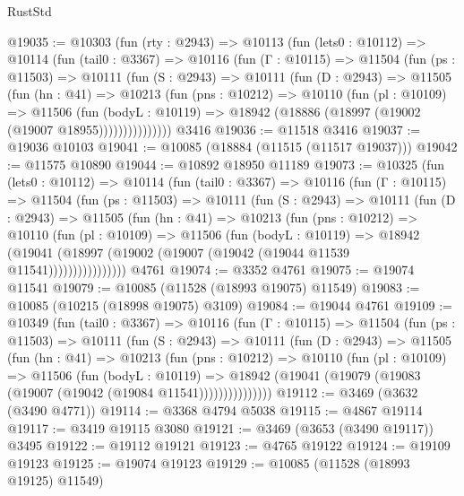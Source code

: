 \begin{lexlean}{RustStd}
\begin{coremodule}
@19035 := @10303
    (fun (rty : @2943) =>
    @10113
      (fun (lets0 : @10112) =>
      @10114
        (fun (tail0 : @3367) =>
        @10116
          (fun (Γ : @10115) =>
          @11504
            (fun (ps : @11503) =>
            @10111
              (fun (S : @2943) =>
              @10111
                (fun (D : @2943) =>
                @11505
                  (fun (hn : @41) =>
                  @10213
                    (fun (pns : @10212) =>
                    @10110
                      (fun (pl : @10109) =>
                      @11506
                        (fun (bodyL : @10119) =>
                        @18942 (@18886 (@18997 (@19002 (@19007 @18955)))))))))))))))
    @3416
@19036 := @11518 @3416
@19037 := @19036 @10103
@19041 := @10085 (@18884 (@11515 (@11517 @19037)))
@19042 := @11575 @10890
@19044 := @10892 @18950 @11189
@19073 := @10325
    (fun (lets0 : @10112) =>
    @10114
      (fun (tail0 : @3367) =>
      @10116
        (fun (Γ : @10115) =>
        @11504
          (fun (ps : @11503) =>
          @10111
            (fun (S : @2943) =>
            @10111
              (fun (D : @2943) =>
              @11505
                (fun (hn : @41) =>
                @10213
                  (fun (pns : @10212) =>
                  @10110
                    (fun (pl : @10109) =>
                    @11506
                      (fun (bodyL : @10119) =>
                      @18942
                        (@19041
                          (@18997 (@19002 (@19007 (@19042 (@19044 @11539 @11541))))))))))))))))
    @4761
@19074 := @3352 @4761
@19075 := @19074 @11541
@19079 := @10085 (@11528 (@18993 @19075) @11549)
@19083 := @10085 (@10215 (@18998 @19075) @3109)
@19084 := @19044 @4761
@19109 := @10349
    (fun (tail0 : @3367) =>
    @10116
      (fun (Γ : @10115) =>
      @11504
        (fun (ps : @11503) =>
        @10111
          (fun (S : @2943) =>
          @10111
            (fun (D : @2943) =>
            @11505
              (fun (hn : @41) =>
              @10213
                (fun (pns : @10212) =>
                @10110
                  (fun (pl : @10109) =>
                  @11506
                    (fun (bodyL : @10119) =>
                    @18942 (@19041 (@19079 (@19083 (@19007 (@19042 (@19084 @11541)))))))))))))))
@19112 := @3469 (@3632 (@3490 @4771))
@19114 := @3368 @4794 @5038
@19115 := @4867 @19114
@19117 := @3419 @19115 @3080
@19121 := @3469 (@3653 (@3490 @19117)) @3495
@19122 := @19112 @19121
@19123 := @4765 @19122
@19124 := @19109 @19123
@19125 := @19074 @19123
@19129 := @10085 (@11528 (@18993 @19125) @11549)

\end{coremodule}
\end{lexlean}
